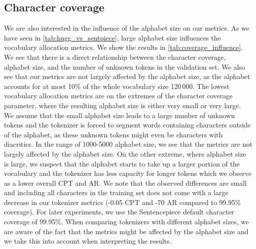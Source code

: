 \subsection{Character coverage}
\label{sec:character_coverage}



We are also interested in the influence of the alphabet size on our metrics. As we have seen in \autoref{tab:hugg_vs_sentpiece}, large alphabet size influences the vocabulary allocation metrics.
We show the results in \autoref{tab:coverage_influence}. 
We see that there is a direct relationship between the character coverage, alphabet size, and the number of unknown tokens in the validation set. We also see that our metrics are not largely affected by the alphabet size, as the alphabet accounts for at most 10\% of the whole vocabulary size 120\,000. The lowest vocabulary allocation metrics are on the extremes of the character coverage parameter, where the resulting alphabet size is either very small or very large. We assume that the small alphabet size leads to a large number of unknown tokens and the tokenizer is forced to segment words containing characters outside of the alphabet, as these unknown tokens might even be characters with diacritics. In the range of 1000-5000 alphabet size, we see that the metrics are not largely affected by the alphabet size. On the other extreme, where alphabet size is large, we suspect that the alphabet starts to take up a larger portion of the vocabulary and the tokenizer has less capacity for longer tokens which we observe as a lower overall CPT and AR. We note that the observed differences are small and including all characters in the training set does not come with a large decrease in our tokenizer metrics (-0.05 CPT and -70 AR compared to 99.95\% coverage). For later experiments, we use the Sentencepiece default character coverage of 99.95\%. When comparing tokenizers with different alphabet sizes, we are aware of the fact that the metrics might be affected by the alphabet size and we take this into account when interpreting the results.

